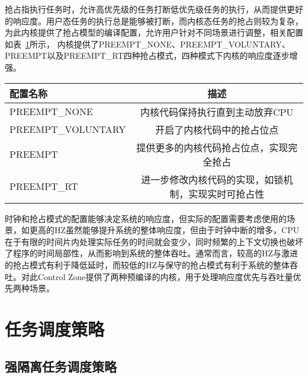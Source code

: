 抢占指执行任务时，允许高优先级的任务打断低优先级任务的执行，从而提供更好的响应度。用户态任务的执行总是能够被打断，而内核态任务的抢占则较为复杂，为此内核提供了抢占模型的编译配置，允许用户针对不同场景进行调整，相关配置如表~\ref{tab:config_preempt}所示， 内核提供了PREEMPT\_NONE、PREEMPT\_VOLUNTARY、PREEMPT以及PREEMPT\_RT四种抢占模式，四种模式下内核的响应度逐步增强。

\begin{table}
    \label{tab:config_preempt}
    \footnotesize%
    \setlength{\tabcolsep}{4pt}%
    \renewcommand{\arraystretch}{1.5}%
    \centering
    \begin{tabular}{lc}
        \hline
        配置名称 & 描述 \\
        \hline
        PREEMPT\_NONE  & 内核代码保持执行直到主动放弃CPU  \\
        PREEMPT\_VOLUNTARY  & 开启了内核代码中的抢占位点 \\
        PREEMPT  & 提供更多的内核代码抢占位点，实现完全抢占 \\
        PREEMPT\_RT & 进一步修改内核代码的实现，如锁机制，实现实时可抢占性 \\
        \hline
    \end{tabular}
\end{table}

时钟和抢占模式的配置能够决定系统的响应度，但实际的配置需要考虑使用的场景，如更高的HZ虽然能够提升系统的整体响应度，但由于时钟中断的增多，CPU在于有限的时间片内处理实际任务的时间就会变少，同时频繁的上下文切换也破坏了程序的时间局部性，从而影响到系统的整体吞吐。通常而言，较高的HZ与激进的抢占模式有利于降低延时，而较低的HZ与保守的抢占模式有利于系统的整体吞吐。对此Control Zone提供了两种预编译的内核，用于处理响应度优先与吞吐量优先两种场景。

\section{任务调度策略}


\subsection{强隔离任务调度策略}

